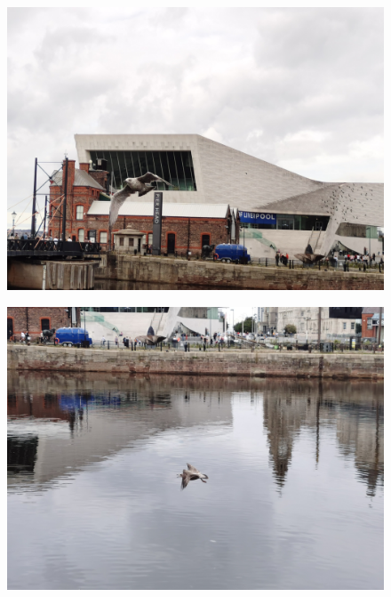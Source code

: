 \documentclass[11pt]{article}
\begin{document}
\begin{figure}[H]
    \centering
    \includegraphics[width=\textwidth]{1T.jpg}
\end{figure}

\begin{figure}[H]
    \centering
    \includegraphics[width=\textwidth]{1U.jpg}
\end{figure}
\end{document}
